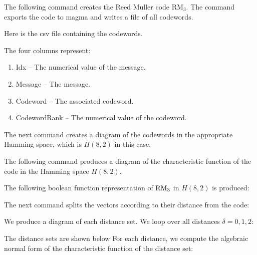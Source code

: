 



The following command creates the Reed Muller code $\mbox{RM}_{3}.$ 
The command exports the code to magma and writes a file of all codewords.


Here is the csv file containing the codewords. 


The four columns represent:
\begin{enumerate}
\item
Idx -- The numerical value of the message.
\item
Message -- The message.
\item
Codeword -- The associated codeword.
\item
CodewordRank -- The numerical value of the codeword.
\end{enumerate}

\bigskip



The next command creates a diagram of the codewords in the appropriate Hamming space, 
which is $H(8,2)$ in this case.


The following command produces a diagram of the characteristic 
function of the code in the Hamming space $H(8,2).$


The following boolean function representation of ${\rm RM}_{3}$ in $H(8,2)$ is produced:


The next command splits the vectors according to their distance from the code:


We produce a diagram of each distance set. 
We loop over all distances $\delta=0,1,2$:


The distance sets are shown below
For each distance, 
we compute the algebraic normal form of the characteristic function of the distance set:




\bigskip

